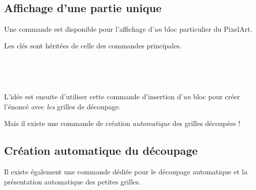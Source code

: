 \documentclass{article}
\begin{document}
\begin{PresentationCode}{}
~~
\end{PresentationCode}

\newpage

\subsection{Affichage d'une partie unique}

Une commande est disponible pour l'affichage d'\textit{un} bloc particulier du PixelArt.

Les clés sont héritées de celle des commandes principales.

\begin{PresentationCode}{}
~~
\end{PresentationCode}

\begin{PresentationCode}{}
~~
\end{PresentationCode}

\smallskip

L'idée est ensuite d'utiliser cette commande d'insertion d'\textit{un} bloc pour créer l'énoncé avec \textit{les} grilles de découpage.

Mais il existe une commande de création \textit{automatique} des grilles découpées !

\newpage

\subsection{Création automatique du découpage}

Il existe également une commande dédiée pour le découpage automatique et la présentation automatique des petites grilles.

\begin{PresentationCode}{}
\end{PresentationCode}
\end{document}
